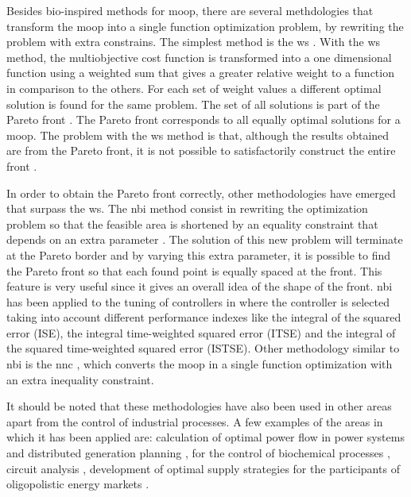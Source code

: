 Besides bio-inspired methods for \gls{moop}, there are several methdologies that transform the \gls{moop} into a single function optimization problem, by rewriting the problem with extra constrains. The simplest method is the \gls{ws} \citep{Marler2004}. With the \gls{ws} method, the multiobjective cost function is transformed into a one dimensional function using a weighted sum that gives a greater relative weight to a function in comparison to the others. For each set of weight values a different optimal solution is found for the same problem. The set of all solutions is part of the Pareto front \citep{Marler2004}. The Pareto front corresponds to all equally optimal solutions for a \gls{moop}. The problem with the \gls{ws} method is that, although the results obtained are from the Pareto front, it is not possible to satisfactorily construct the entire front \citep{Das1997,Messac2000,Marler2010}.

In order to obtain the Pareto front correctly, other methodologies have emerged that surpass the \gls{ws}. The \gls{nbi} method consist in rewriting the optimization problem so that the feasible area is shortened by an equality constraint that depends on an extra parameter \citep{Das1998}. The solution of this new problem will terminate at the Pareto border and by varying this extra parameter, it is possible to find the Pareto front so that each found point is equally spaced at the front. This feature is very useful since it gives an overall idea of the shape of the front. \gls{nbi} has been applied to the tuning of controllers in \citet{Gambier2009} where the controller is selected taking into account different performance indexes like the integral of the squared error (ISE), the integral time-weighted squared error (ITSE) and the integral of the squared time-weighted squared error (ISTSE). Other methodology similar to \gls{nbi} is the \gls{nnc} \citep{Messac2003}, which converts the \gls{moop} in a single function optimization with an extra inequality constraint.

It should be noted that these methodologies have also been used in other areas apart from the control of industrial processes. A few examples of the areas in which it has been applied are: calculation of optimal power flow in power systems \citep{Roman2006}  and distributed generation planning \citep{Zangeneh2007},  for the control of biochemical processes \citep{Logist2009}, circuit analysis \citep{Stehr2003}, development of optimal supply strategies for the participants of oligopolistic energy markets \citep{Vahidinasab2010}.

